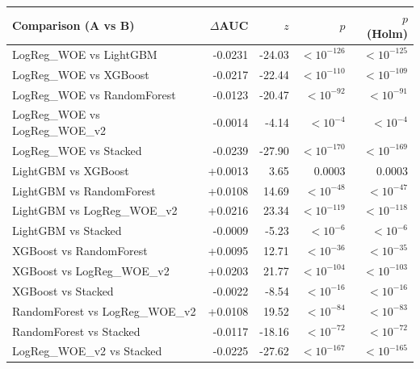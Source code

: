 \begin{tabular}{lrrrr}
\toprule
Comparison (A vs B) & $\Delta$AUC & $z$ & $p$ & $p$ (Holm) \\
\midrule
LogReg\_WOE vs LightGBM & -0.0231 & -24.03 & $<10^{-126}$ & $<10^{-125}$ \\
LogReg\_WOE vs XGBoost & -0.0217 & -22.44 & $<10^{-110}$ & $<10^{-109}$ \\
LogReg\_WOE vs RandomForest & -0.0123 & -20.47 & $<10^{-92}$ & $<10^{-91}$ \\
LogReg\_WOE vs LogReg\_WOE\_v2 & -0.0014 & -4.14 & $<10^{-4}$ & $<10^{-4}$ \\
LogReg\_WOE vs Stacked & -0.0239 & -27.90 & $<10^{-170}$ & $<10^{-169}$ \\
LightGBM vs XGBoost & +0.0013 & 3.65 & 0.0003 & 0.0003 \\
LightGBM vs RandomForest & +0.0108 & 14.69 & $<10^{-48}$ & $<10^{-47}$ \\
LightGBM vs LogReg\_WOE\_v2 & +0.0216 & 23.34 & $<10^{-119}$ & $<10^{-118}$ \\
LightGBM vs Stacked & -0.0009 & -5.23 & $<10^{-6}$ & $<10^{-6}$ \\
XGBoost vs RandomForest & +0.0095 & 12.71 & $<10^{-36}$ & $<10^{-35}$ \\
XGBoost vs LogReg\_WOE\_v2 & +0.0203 & 21.77 & $<10^{-104}$ & $<10^{-103}$ \\
XGBoost vs Stacked & -0.0022 & -8.54 & $<10^{-16}$ & $<10^{-16}$ \\
RandomForest vs LogReg\_WOE\_v2 & +0.0108 & 19.52 & $<10^{-84}$ & $<10^{-83}$ \\
RandomForest vs Stacked & -0.0117 & -18.16 & $<10^{-72}$ & $<10^{-72}$ \\
LogReg\_WOE\_v2 vs Stacked & -0.0225 & -27.62 & $<10^{-167}$ & $<10^{-165}$ \\
\bottomrule
\end{tabular}
